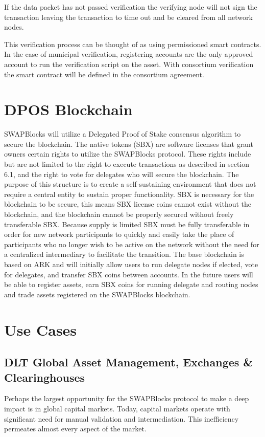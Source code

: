 \documentclass[12pt]{article}
\begin{document}
If the data packet has not passed verification the verifying node will not sign the transaction
leaving the transaction to time out and be cleared from all network nodes.

This verification process can be thought of as using permissioned smart contracts.  In the case of municipal
verification, registering accounts are the only approved account to run the verification script on the asset.
With consortium verification the smart contract will be defined in the consortium agreement.


\section{DPOS Blockchain}
SWAPBlocks will utilize a Delegated Proof of Stake consensus algorithm to secure the blockchain. The native 
tokens (SBX) are software licenses that grant owners certain rights to utilize the SWAPBlocks protocol. These 
rights include but are not limited to the right to execute transactions as described in section 6.1, and 
the right to vote for delegates who will secure the blockchain. The purpose of this structure is to create a 
self-sustaining environment that does not require a central entity to sustain proper functionality. SBX is necessary 
for the blockchain to be secure, this means SBX license coins cannot exist without the blockchain, and the 
blockchain cannot be properly secured without freely transferable SBX. 
Because supply is limited SBX must be fully transferable in order for new network participants to quickly and easily take the place of participants who no longer wish to be active on the network without the need for 
a centralized intermediary to facilitate the transition. The base blockchain is based on ARK and will initially allow 
users to run delegate nodes if elected, vote for delegates, and transfer SBX coins between accounts. In the future 
users will be able to register assets, earn SBX coins for running delegate and routing nodes and trade assets 
registered on the SWAPBlocks blockchain.  


\pagebreak

\section{Use Cases}

\subsection{DLT Global Asset Management, Exchanges \& Clearinghouses}
Perhaps the largest opportunity for the SWAPBlocks protocol to make a deep impact is in global capital markets. Today, 
capital markets operate with significant need for manual validation and intermediation. This inefficiency permeates 
almost every aspect of the market.
\end{document}
